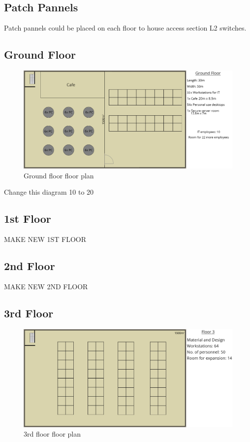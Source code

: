 \subsection{Patch Pannels}
Patch pannels could be placed on each floor to house access section L2 switches.
\subsection{Ground Floor}
\begin{figure}[h]
    \includegraphics[width=15cm]{Figures/ground.png}
    \caption{Ground floor floor plan}
    \label{ground_floor}
\end{figure}
Change this diagram 10 to 20
\subsection{1st Floor}
\begin{huge}
    MAKE NEW 1ST FLOOR
\end{huge}
\subsection{2nd Floor}
\begin{huge}
    MAKE NEW 2ND FLOOR
\end{huge}
\subsection{3rd Floor}
\begin{figure}[h]
    \includegraphics[width=15cm]{Figures/3rd-Floor.png}
    \caption{3rd floor floor plan}
    \label{3rd_floor}
\end{figure}
